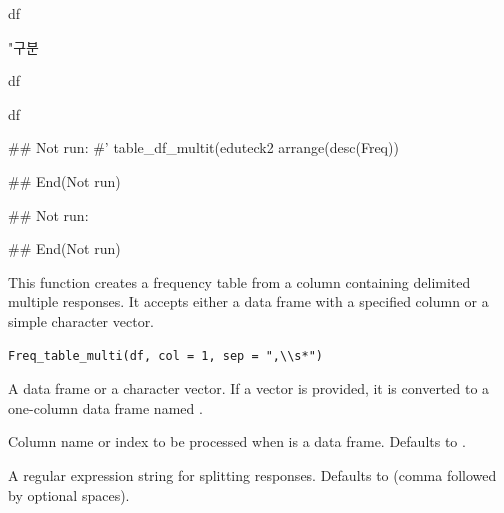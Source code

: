 \documentclass[a4paper]{book}
\begin{document}
%
\begin{Arguments}
\begin{ldescription}
\item[\code{df}] df

\item[\code{input}] "구분
\end{ldescription}
\end{Arguments}
%
\begin{Value}
df

df
\end{Value}
%
\begin{Examples}
\begin{ExampleCode}
## Not run: 
#' table_df_multit(eduteck2 %
arrange(desc(Freq)) %

## End(Not run)

## Not run: 



## End(Not run)
\end{ExampleCode}
\end{Examples}
%
\begin{Description}
This function creates a frequency table from a column containing delimited multiple responses.
It accepts either a data frame with a specified column or a simple character vector.
\end{Description}
%
\begin{Usage}
\begin{verbatim}
Freq_table_multi(df, col = 1, sep = ",\\s*")
\end{verbatim}
\end{Usage}
%
\begin{Arguments}
\begin{ldescription}
\item[\code{df}] A data frame or a character vector. If a vector is provided, it is converted to a one-column data frame named .

\item[\code{col}] Column name or index to be processed when  is a data frame. Defaults to .

\item[\code{sep}] A regular expression string for splitting responses. Defaults to  (comma followed by optional spaces).
\end{ldescription}
\end{Arguments}
\end{document}
